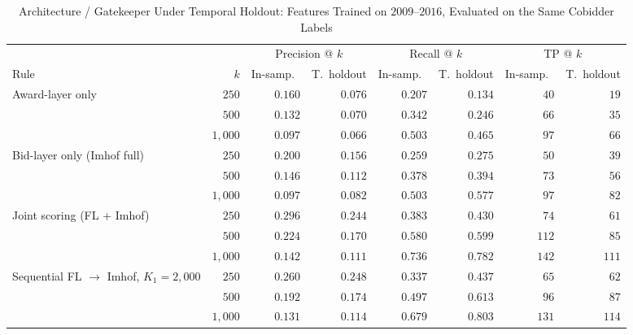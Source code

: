 \begin{table}[htbp]
\centering
\caption{Architecture / Gatekeeper Under Temporal Holdout: Features Trained on $2009$--$2016$, Evaluated on the Same Cobidder Labels}
\label{tab:architecture_gatekeeper_th}
\begin{adjustbox}{max width=\textwidth,center}
\begin{threeparttable}
\footnotesize
\begin{tabular}{lrrrrrrr}
\toprule
 & & \multicolumn{2}{c}{Precision @ $k$} & \multicolumn{2}{c}{Recall @ $k$} & \multicolumn{2}{c}{TP @ $k$} \\
\cmidrule(lr){3-4} \cmidrule(lr){5-6} \cmidrule(lr){7-8}
Rule & $k$ & In-samp.\ & T.\ holdout & In-samp.\ & T.\ holdout & In-samp.\ & T.\ holdout \\
\midrule
Award-layer only & $250$ & $0.160$ & $0.076$ & $0.207$ & $0.134$ & $40$ & $19$ \\
 & $500$ & $0.132$ & $0.070$ & $0.342$ & $0.246$ & $66$ & $35$ \\
 & $1{,}000$ & $0.097$ & $0.066$ & $0.503$ & $0.465$ & $97$ & $66$ \\
Bid-layer only (Imhof full) & $250$ & $0.200$ & $0.156$ & $0.259$ & $0.275$ & $50$ & $39$ \\
 & $500$ & $0.146$ & $0.112$ & $0.378$ & $0.394$ & $73$ & $56$ \\
 & $1{,}000$ & $0.097$ & $0.082$ & $0.503$ & $0.577$ & $97$ & $82$ \\
Joint scoring (FL + Imhof) & $250$ & $0.296$ & $0.244$ & $0.383$ & $0.430$ & $74$ & $61$ \\
 & $500$ & $0.224$ & $0.170$ & $0.580$ & $0.599$ & $112$ & $85$ \\
 & $1{,}000$ & $0.142$ & $0.111$ & $0.736$ & $0.782$ & $142$ & $111$ \\
Sequential FL $\rightarrow$ Imhof, $K_1=2{,}000$ & $250$ & $0.260$ & $0.248$ & $0.337$ & $0.437$ & $65$ & $62$ \\
 & $500$ & $0.192$ & $0.174$ & $0.497$ & $0.613$ & $96$ & $87$ \\
 & $1{,}000$ & $0.131$ & $0.114$ & $0.679$ & $0.803$ & $131$ & $114$ \\
\bottomrule
\end{tabular}
\begin{tablenotes}
\footnotesize

\end{tablenotes}
\end{threeparttable}
\end{adjustbox}
\end{table}
